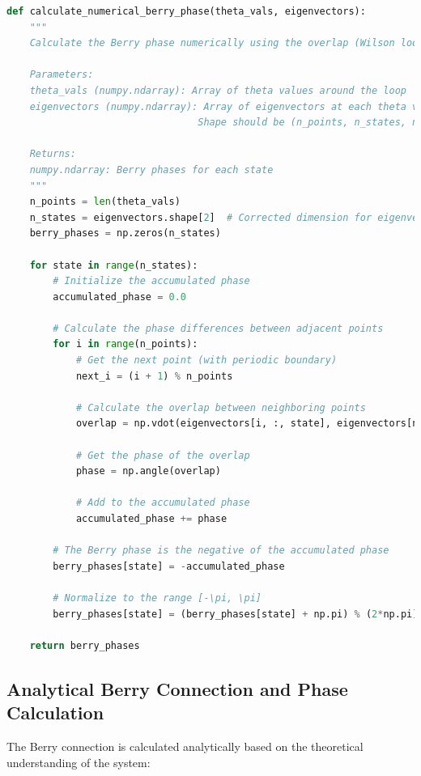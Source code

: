 \documentclass[12pt,a4paper]{article}
\begin{document}
\begin{lstlisting}[language=Python, caption=Numerical Berry Phase Calculation]
def calculate_numerical_berry_phase(theta_vals, eigenvectors):
    """
    Calculate the Berry phase numerically using the overlap (Wilson loop) method.
    
    Parameters:
    theta_vals (numpy.ndarray): Array of theta values around the loop
    eigenvectors (numpy.ndarray): Array of eigenvectors at each theta value
                                 Shape should be (n_points, n_states, n_states)
    
    Returns:
    numpy.ndarray: Berry phases for each state
    """
    n_points = len(theta_vals)
    n_states = eigenvectors.shape[2]  # Corrected dimension for eigenvectors
    berry_phases = np.zeros(n_states)
    
    for state in range(n_states):
        # Initialize the accumulated phase
        accumulated_phase = 0.0
        
        # Calculate the phase differences between adjacent points
        for i in range(n_points):
            # Get the next point (with periodic boundary)
            next_i = (i + 1) % n_points
            
            # Calculate the overlap between neighboring points
            overlap = np.vdot(eigenvectors[i, :, state], eigenvectors[next_i, :, state])
            
            # Get the phase of the overlap
            phase = np.angle(overlap)
            
            # Add to the accumulated phase
            accumulated_phase += phase
        
        # The Berry phase is the negative of the accumulated phase
        berry_phases[state] = -accumulated_phase
        
        # Normalize to the range [-\pi, \pi]
        berry_phases[state] = (berry_phases[state] + np.pi) % (2*np.pi) - np.pi
    
    return berry_phases
\end{lstlisting}

\subsection{Analytical Berry Connection and Phase Calculation}

The Berry connection is calculated analytically based on the theoretical understanding of the system:
\end{document}
